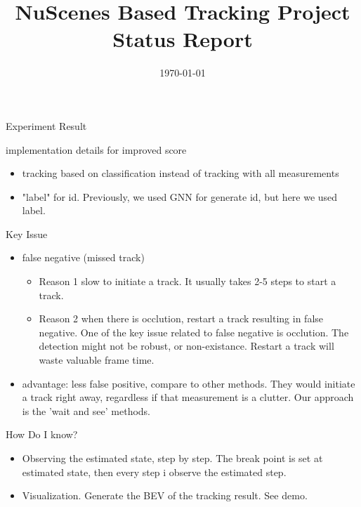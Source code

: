 \documentclass[aspectratio=169,xcolor=dvipsnames]{beamer}
\title{NuScenes Based Tracking Project Status Report} %
\date{\today} %
\begin{document}
\begin{frame}
    \titlepage
\end{frame}

\begin{frame}{Experiment Result}
    \href{https://docs.google.com/spreadsheets/d/e/2PACX-1vQg2MSCst4ShlC0e7T_lr_q4azo-DfDo53On89BjeisHAKJrggMLoTUxcvurpXomLZilYKoWmMMf6U4/pubhtml}{}
\end{frame}

\begin{frame}{implementation details for improved score}
    \begin{itemize}
        \item{tracking based on classification instead of tracking with all measurements}
        \item{"label" for id. Previously, we used GNN for generate id, but here we used label.}
    \end{itemize}
\end{frame}

\begin{frame}{Key Issue}
    \begin{itemize}
        \item{false negative (missed track)}
        \begin{itemize}
            \item{Reason 1 slow to initiate a track. It usually takes 2-5 steps to start a track. }
            \item{Reason 2 when there is occlution, restart a track resulting in false negative. One of the key issue related to false negative is occlution. The detection might not be robust, or non-existance. Restart a track will waste valuable frame time. }
        \end{itemize}
        \item{advantage: less false positive, compare to other methods. They would initiate a track right away, regardless if that measurement is a clutter. Our approach is the 'wait and see' methods.}
    \end{itemize}
\end{frame}

\begin{frame}{How Do I know?}
    \begin{itemize}
        \item{Observing the estimated state, step by step. The break point is set at estimated state, then every step i observe the estimated step.}
        \item{Visualization. Generate the BEV of the tracking result. See demo. }
    \end{itemize}
\end{frame}
\end{document}
